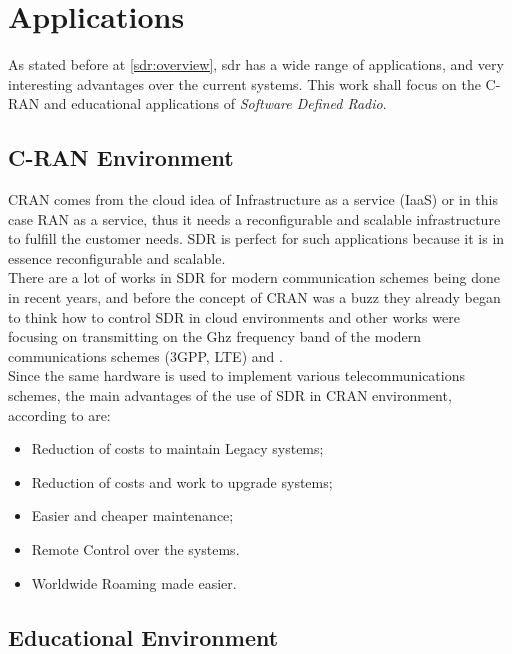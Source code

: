 \section{Applications}
\label{sec:sdr_app}

As stated before  at \ref{sdr:overview}, sdr has a wide range of applications,
and very interesting advantages over the current systems. This work shall focus
on the C-RAN and educational applications of \emph{Software Defined Radio}.

\subsection{C-RAN Environment}

CRAN comes from the cloud idea of Infrastructure as a service (IaaS) or in this
case RAN as a service, thus it needs a reconfigurable and scalable infrastructure
to fulfill the customer needs. SDR is perfect for such applications because  it
is in essence reconfigurable and scalable.\\

There are a lot of works in SDR for modern communication schemes being done in recent years,
and before the concept of CRAN was a buzz they already began to think how to control
SDR in cloud environments \cite{dayananda2012} and other works were focusing on transmitting on the
Ghz frequency band of the modern communications schemes (3GPP, LTE) \cite{kelley2009} and \cite{neenu2014}.\\

Since the same hardware is used to implement various telecommunications schemes,
the main advantages of the use of SDR in CRAN environment, according to \cite{dayananda2012} are:

\begin{itemize}
    \item Reduction of costs to maintain Legacy systems;
    \item Reduction of costs and work to upgrade systems;
    \item Easier and cheaper maintenance;
    \item Remote Control over the systems.
    \item Worldwide Roaming made easier.
\end{itemize}


\subsection{Educational Environment}

